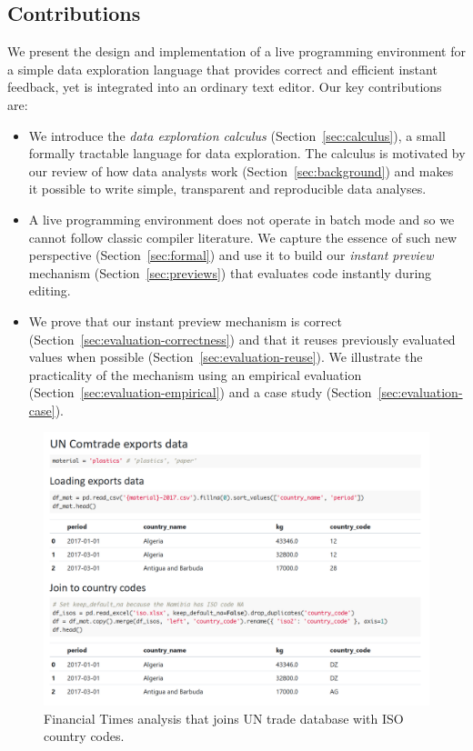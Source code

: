 \documentclass[english,crc]{programming}
\theoremstyle{plain}
\theoremstyle{definition}
\begin{document}
\subsection*{Contributions}
We present the design and implementation of a live programming environment for a simple data exploration
language that provides correct and efficient instant feedback, yet is integrated into an
ordinary text editor. Our key contributions are:

\begin{itemize}
\item We introduce the \emph{data exploration calculus} (Section~\ref{sec:calculus}), a small formally
  tractable language for data exploration. The calculus is motivated by our review
  of how data analysts work (Section~\ref{sec:background}) and makes it possible to write simple,
  transparent and reproducible data analyses.

\item A live programming environment does not operate in batch mode and so we cannot follow classic
  compiler literature. We capture the essence of such new perspective (Section~\ref{sec:formal})
  and use it to build our \emph{instant preview} mechanism (Section~\ref{sec:previews}) that evaluates
  code instantly during editing.

\item We prove that our instant preview mechanism is correct (Section~\ref{sec:evaluation-correctness}) and that
  it reuses previously evaluated values when possible (Section~\ref{sec:evaluation-reuse}). We
  illustrate the practicality of the mechanism using an empirical evaluation
  (Section~\ref{sec:evaluation-empirical}) and a case study (Section~\ref{sec:evaluation-case}).
\end{itemize}


\begin{figure}[b]
\hspace{1em}\includegraphics[scale=0.52]{figures/notebook.png}
\caption{Financial Times analysis that joins UN trade database with ISO country codes.}
\label{fig:ft-uncomtrade}
\end{figure}
\end{document}
